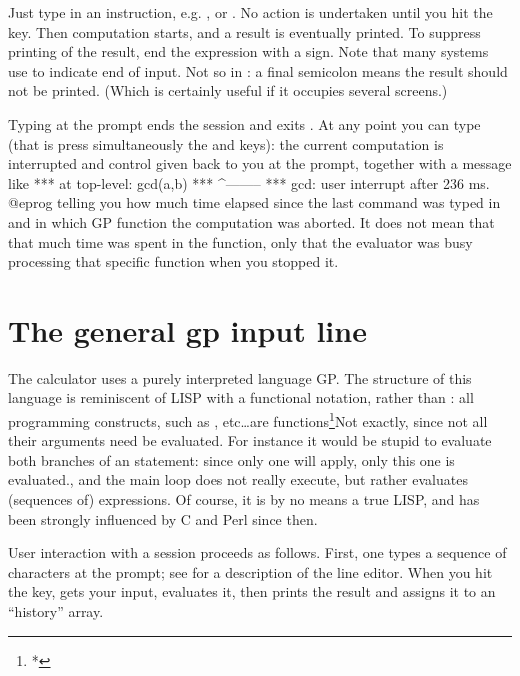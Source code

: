 
Just type in an instruction, e.g. , or . No action is
undertaken until you hit the  key. Then computation starts, and
a result is eventually printed. To suppress printing of the result, end the
expression with a \kbd{;} sign. Note that many systems use \kbd{;} to
indicate end of input. Not so in : a final semicolon means the
result should not be printed. (Which is certainly useful if it occupies
several screens.)


Typing  at the prompt ends the session and exits . At any
point you can type  (that is press simultaneously the
 and  keys): the current computation is interrupted and
control given back to you at the  prompt, together with a message
like
\bprog
  ***   at top-level: gcd(a,b)
  ***                 ^--------
  *** gcd: user interrupt after 236 ms.
@eprog\noindent
telling you how much time elapsed since the last command was typed in and
in which GP function the computation was aborted. It does not mean that that
much time was spent in the function, only that the evaluator was busy
processing that specific function when you stopped it.

\section{The general gp input line}

The  calculator uses a purely interpreted language GP. The structure
of this language is reminiscent of LISP with a functional notation,
 rather than : all programming constructs,
such as ,  etc\dots are functions\footnote{*}{Not exactly,
since not all their arguments need be evaluated. For instance it would be
stupid to evaluate both branches of an  statement: since only one
will apply, only this one is evaluated.}, and the main loop does not really
execute, but rather evaluates (sequences of) expressions. Of course, it is by
no means a true LISP, and has been strongly influenced by C and Perl since
then.

 User interaction with a  session proceeds as
follows. First, one types a sequence of characters at the  prompt;
see  for a description of the line editor. When you hit
the  key,  gets your input, evaluates it, then prints
the result and assigns it to an ``history'' array.

